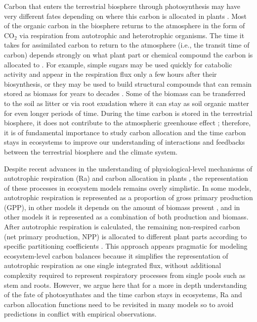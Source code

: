 \documentclass[bg, manuscript]{copernicus}
\begin{document}
\introduction  %
Carbon that enters the terrestrial biosphere through photosynthesis may have very different fates depending on where this carbon is allocated in plants \citep{Trumbore2006}. Most of the organic carbon in the biosphere returns to the atmosphere in the form of CO$_2$ via respiration from autotrophic and heterotrophic organisms. The time it takes for assimilated carbon to return to the atmosphere (i.e., the transit time of carbon) depends strongly on what plant part or chemical compound the carbon is allocated to \citep{Rasmussen2016, Luo2017, Lu2018, Herrera2020}. For example, simple sugars may be used quickly for catabolic activity and appear in the respiration flux only a few hours after their biosynthesis, or they may be used to build structural compounds that can remain stored as biomass for years to decades \citep{Hartmann2016}. Some of the biomass can be transferred to the soil as litter or via root exudation where it can stay as soil organic matter for even longer periods of time. During the time carbon is stored in the terrestrial biosphere, it does not contribute to the atmospheric greenhouse effect \citep{Neubauer2015,Sierra2021BGS}; therefore, it is of fundamental importance to study carbon allocation and the time carbon stays in ecosystems to improve our understanding of interactions and feedbacks between the terrestrial biosphere and the climate system. 

Despite recent advances in the understanding of physiological-level mechanisms of autotrophic respiration (Ra) and carbon allocation in plants \citep{Hartmann2016}, the representation of these processes in ecosystem models remains overly simplistic. In some models, autotrophic respiration is represented as a proportion of gross primary production (GPP), in other models it depends on the amount of biomass present \citep{Collalti2020}, and in other models it is represented as a combination of both production and biomass. After autotrophic respiration is calculated, the remaining non-respired carbon (net primary production, NPP) is allocated to different plant parts according to specific partitioning coefficients \citep{Franklin2012, Ceballos2020}. This approach appears pragmatic for modeling ecosystem-level carbon balances because it simplifies the representation of autotrophic respiration as one single integrated flux, without additional complexity required to represent respiratory processes from single pools such as stem and roots. However, we argue here that for a more in depth understanding of the fate of photosynthates and the time carbon stays in ecosystems, Ra and carbon allocation functions need to be revisited in many models so to avoid predictions in conflict with empirical observations. 
\end{document}
